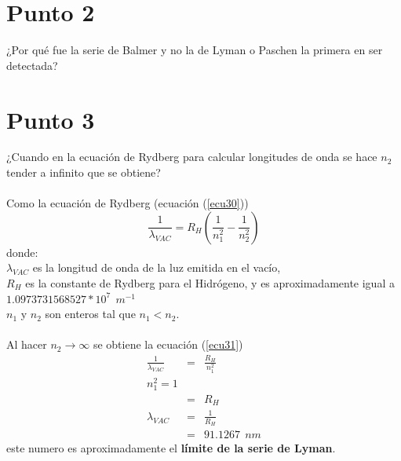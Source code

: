 \documentclass[11pt,graphicx,caption,rotating]{article}
\begin{document}
\section{Punto 2}
\noindent
¿Por qué fue la serie de Balmer y no la de Lyman o Paschen la primera en ser detectada?


\section{Punto 3}
\noindent
¿Cuando en la ecuación de Rydberg para calcular longitudes de onda se hace $n_2$ tender a infinito que se obtiene?\\\\
Como la ecuación de Rydberg (ecuación (\ref{ecu30}))
\begin{equation}
 \frac{1}{\lambda_{VAC}}=R_{H}\left( {\frac{1}{{n_1^2 }} - \frac{1}{{n_2^2 }}} \right)
\label{ecu30}
\end{equation}
\noindent
donde:\\
$\lambda_{VAC}$ es la longitud de onda de la luz emitida en el vacío,\\
$R_H$ es la constante de Rydberg para el Hidrógeno, y es aproximadamente igual a $1.097 373 156 852 7*10^7\ \ m^{-1}$\\
$n_1$ y $n_2$ son enteros tal que $n_1 < n_2$.\\\\
Al hacer $n_2 \rightarrow \infty$ se obtiene la ecuación (\ref{ecu31})
\begin{eqnarray}
 \frac{1}{\lambda_{VAC}} & = & \frac{R_{H}}{n_1^2 }\label{ecu31} \\ 
 n_1^2 = 1\nonumber \\
 & = & R_H \nonumber \\
 \lambda_{VAC} & = & \frac{1}{R_H} \label{ecu32}\\
 & = & 91.1267\ \ nm\nonumber
\end{eqnarray}
\noindent
este numero es aproximadamente el \textbf{límite de la serie de Lyman}.
\end{document}
